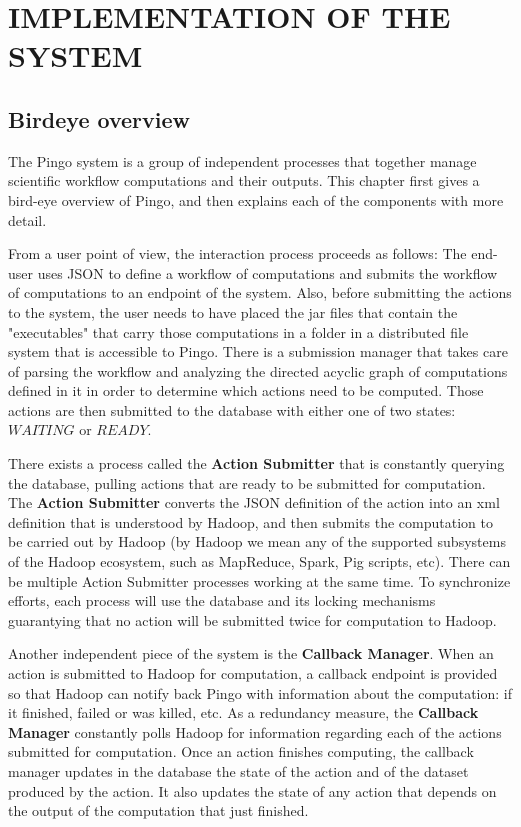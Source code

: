 \chapter{IMPLEMENTATION OF THE SYSTEM}
\label{chap:implementation}
\section{Birdeye overview}
The Pingo system is a group of independent processes that together manage scientific workflow computations and their outputs.  This chapter first gives a bird-eye overview of Pingo, and then explains each of the components with more detail. 

From a user point of view, the interaction process proceeds as follows: The end-user uses JSON to define a workflow of computations and submits the workflow of computations to an endpoint of the system. Also, before submitting the actions to the system, the user needs to have placed the jar files that contain the "executables" that carry those computations in a folder in a distributed file system that is accessible to Pingo. There is a submission manager that takes care of parsing the workflow and analyzing the directed acyclic graph of computations defined in it in order to determine which actions need to be computed.  Those actions are then submitted to the database with either one of two states: $WAITING$ or $READY$.

There exists a process called the \textbf{Action Submitter} that is constantly querying the database, pulling actions that are ready to be submitted for computation. The \textbf{Action Submitter} converts the JSON definition of the action into an xml definition that is understood by Hadoop, and then submits the computation to be carried out by Hadoop (by Hadoop we mean any of the supported subsystems of the Hadoop ecosystem, such as MapReduce, Spark, Pig scripts, etc). There can be multiple Action Submitter processes working at the same time.  To synchronize efforts, each process will use the database and its locking mechanisms guarantying that no action will be submitted twice for computation to Hadoop.

Another independent piece of the system is the \textbf{Callback Manager}.  When an action is submitted  to Hadoop for computation, a callback endpoint is provided so that Hadoop can notify back Pingo with information about the computation: if it finished, failed or was killed, etc.  As a redundancy measure, the \textbf{Callback Manager} constantly polls Hadoop for information regarding each of the actions submitted for computation.  Once an action finishes computing, the callback manager updates in the database the state of the action and of the dataset produced by the action.  It also updates the state of any action that depends on the output of the computation that just finished.


